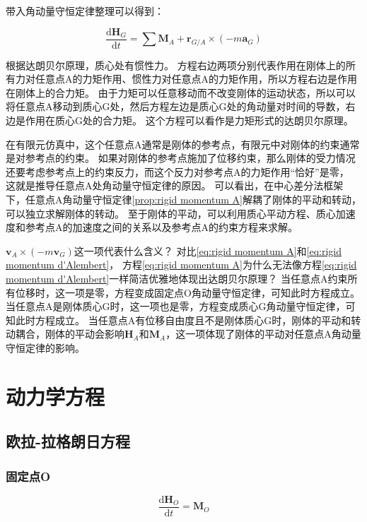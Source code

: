 带入角动量守恒定律整理可以得到：
\begin{proposition}[力矩形式的达朗贝尔原理]
  \begin{equation}
    \frac{\mathrm{d}\bm{H}_G}{\mathrm{d}t}=\sum\bm{M}_A+\bm{r}_{G/A}\times(-m\bm{a}_G)
    \label{eq:rigid momentum d'Alembert}
  \end{equation}
\end{proposition}

根据达朗贝尔原理，质心处有惯性力。
方程右边两项分别代表作用在刚体上的所有力对任意点A的力矩作用、惯性力对任意点A的力矩作用，所以方程右边是作用在刚体上的合力矩。
由于力矩可以任意移动而不改变刚体的运动状态，所以可以将任意点A移动到质心G处，然后方程左边是质心G处的角动量对时间的导数，右边是作用在质心G处的合力矩。
这个方程可以看作是力矩形式的达朗贝尔原理。

在有限元仿真中，这个任意点A通常是刚体的参考点，有限元中对刚体的约束通常是对参考点的约束。
如果对刚体的参考点施加了位移约束，那么刚体的受力情况还要考虑参考点上的约束反力，而这个反力对参考点A的力矩作用“恰好”是零，
这就是推导任意点A处角动量守恒定律的原因。
可以看出，在中心差分法框架下，任意点A角动量守恒定律\ref{prop:rigid momentum A}解耦了刚体的平动和转动，可以独立求解刚体的转动。
至于刚体的平动，可以利用质心平动方程、质心加速度和参考点A的加速度之间的关系以及参考点A的约束方程来求解。

\begin{note}
  $\boxed{\bm{v}_A\times(-m\bm{v}_G)}$这一项代表什么含义？
  对比\ref{eq:rigid momentum A}和\ref{eq:rigid momentum d'Alembert}，
  方程\ref{eq:rigid momentum A}为什么无法像方程\ref{eq:rigid momentum d'Alembert}一样简洁优雅地体现出达朗贝尔原理？
  当任意点A约束所有位移时，这一项是零，方程变成固定点O角动量守恒定律，可知此时方程成立。
  当任意点A是刚体质心G时，这一项也是零，方程变成质心G角动量守恒定律，可知此时方程成立。
  当任意点A有位移自由度且不是刚体质心G时，刚体的平动和转动耦合，刚体的平动会影响$\bm{H}_A$和$\bm{M}_A$，这一项体现了刚体的平动对任意点A角动量守恒定律的影响。
\end{note}

\section{动力学方程}
\subsection{欧拉-拉格朗日方程}
\subsubsection*{固定点O}
\begin{equation}
  \frac{\mathrm{d}\bm{H}_O}{\mathrm{d}t}=\bm{M}_O
\end{equation}

